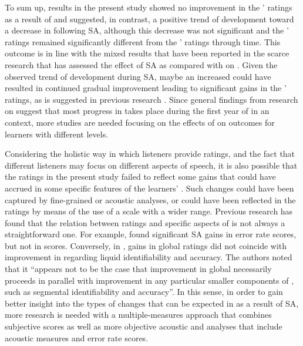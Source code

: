 \documentclass[output=paper]{langsci/langscibook}
\begin{document}
To sum up, results in the present study showed no improvement in the ’  ratings as a result of  and suggested, in contrast, a positive trend of development toward a decrease in  following SA, although this decrease was not significant and the ’  ratings remained significantly different from the ’  ratings through time. This outcome is in line with the mixed results that have been reported in the scarce research that has assessed the effect of SA as compared with  on  . Given the observed trend of development during SA, maybe an increased  could have resulted in continued gradual improvement leading to significant gains in the ’  ratings, as is suggested in previous research \cite{Højen2003}. Since general findings from research on   suggest that most progress in  takes place during the first year of  in an  context, more studies are needed focusing on the effects of  on  outcomes for  learners with different  levels. 

Considering the holistic way in which listeners provide  ratings, and the fact that different listeners may focus on different aspects of  speech, it is also possible that the  ratings in the present study failed to reflect some gains that could have accrued in some specific features of the learners’  . Such changes could have been captured by fine-grained  or acoustic analyses, or could have been reflected in the  ratings by means of the use of a scale with a wider range. Previous research has found that the relation between  ratings and specific aspects of  is not always a straightforward one. For example, \citet{AvelloEtAl2012} found significant SA gains in  error rate scores, but not in  scores. Conversely, in \citet[237]{RineyFlege1998}, gains in global  ratings did not coincide with improvement in  regarding liquid identifiability and accuracy. The authors noted that it “appears not to be the case that improvement in global  necessarily proceeds in parallel with improvement in any particular smaller components of , such as segmental identifiability and accuracy”. In this sense, in order to gain better insight into the types of changes that can be expected in   as a result of SA, more research is needed with a multiple-measures approach that combines subjective  scores as well as more objective acoustic and  analyses that include acoustic measures and error rate scores.
\end{document}
